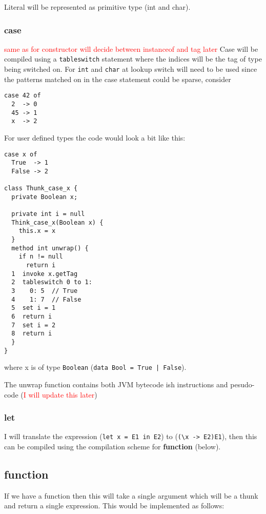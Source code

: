 \documentclass[12pt,a4paper,twoside]{article}
\begin{document}
Literal will be represented as primitive type (int and char).

\subsubsection{case}

\textcolor{red}{same as for constructor will decide between instanceof and tag later}
Case will be compiled using a \texttt{tableswitch} statement where the indices will be the tag of type being switched on. For \texttt{int} and \texttt{char} at lookup 
switch will need to be used since the patterns matched on in the case statement could be sparse, consider

\begin{verbatim}
case 42 of
  2  -> 0
  45 -> 1
  x  -> 2
\end{verbatim}

For user defined types the code would look a bit like this:

\begin{verbatim}
case x of
  True  -> 1
  False -> 2

class Thunk_case_x {
  private Boolean x;

  private int i = null
  Think_case_x(Boolean x) {
    this.x = x
  }
  method int unwrap() {
    if n != null
      return i
  1  invoke x.getTag
  2  tableswitch 0 to 1:
  3    0: 5  // True
  4    1: 7  // False
  5  set i = 1
  6  return i
  7  set i = 2
  8  return i
  }
}
\end{verbatim}

where x is of type \texttt{Boolean} (\texttt{data Bool = True | False}).

The unwrap function contains both JVM bytecode ish instructions and pesudo-code (\textcolor{red}{I will update this later})

\subsubsection{let} 

I will translate the expression (\texttt{let x = E1 in E2}) to (\texttt{(\textbackslash x -> E2)E1}), then 
this can be compiled using the compilation scheme for \textbf{function} (below).

\subsection{function}

If we have a function then this will take a single argument which will be a thunk and return a single expression. 
This would be implemented as follows:
\end{document}
